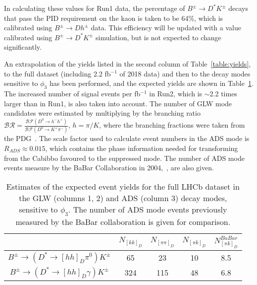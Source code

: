 \documentclass[oneside,12pt]{article}
\begin{document}
In calculating these values for Run1 data, the percentage of $B^{\pm}\rightarrow
D^*K^{\pm}$ decays that pass the PID requirement on the kaon is taken to be
64\%, which is calibrated using $B^{\pm}\rightarrow Dh^{\pm}$ data.  This
efficiency will be updated with a value calibrated using $B^{\pm}\rightarrow
D^*K^{\pm}$ simulation, but is not expected to change significantly.

An extrapolation of the yields listed in the second column of
Table~\ref{table:yields}, to the full dataset (including 2.2 fb$^{-1}$ of 2018
data) and then to the decay modes sensitive to $\phi_3$ has been performed, and
the expected yields are shown in Table~\ref{table:extrapolatedYields}. The
increased number of signal events per fb$^{-1}$ in Run2, which is $\sim$2.2
times larger than in Run1, is also taken into account. The number of GLW mode
candidates were estimated by multiplying by the branching ratio $\mathcal{BR} =
\frac{\mathcal{BF}(D^0 \rightarrow h^- h^+)}{\mathcal{BF}(D^0 \rightarrow K^+
\pi^-)}$, $h=\pi/K$, where the branching fractions were taken from the
PDG~\cite{PDG2018}. The scale factor used to calculate event numbers in the ADS
mode is $R_{ADS}\approx 0.015$, which contains the phase information needed for
transforming from the Cabibbo favoured to the suppressed mode.  The number of
ADS mode events measure by the BaBar Collaboration in 2004,~\cite{BaBarADS}, are
also given.

\begin{table}[H]
  \centering
  \begin{tabular}{| c | c | c | c | c |}
    \hline
    & $N_{[kk]_{D}}$ & $N_{[\pi\pi]_{D}}$ & $N_{[\pi k]_D}$ & $N_{[\pi k]_D}^{BaBar}$ \\ \hline
    $B^{\pm}\rightarrow(D^*\rightarrow [hh]_D\pi^0)K^{\pm}$ & 65 & 23  & 10 & 8.5 \\ \hline
    $B^{\pm}\rightarrow(D^*\rightarrow [hh]_D\gamma)K^{\pm}$ & 324 & 115 & 48 & 6.8 \\ \hline
  \end{tabular}
  \caption{{Estimates of the expected event yields for the full LHCb
  dataset in the GLW (columns 1, 2) and ADS (column 3) decay modes, sensitive to
  $\phi_3$. The number of ADS mode events previously measured by the BaBar
  collaboration is given for comparison.}} \label{table:extrapolatedYields}
\end{table}

\end{document}

